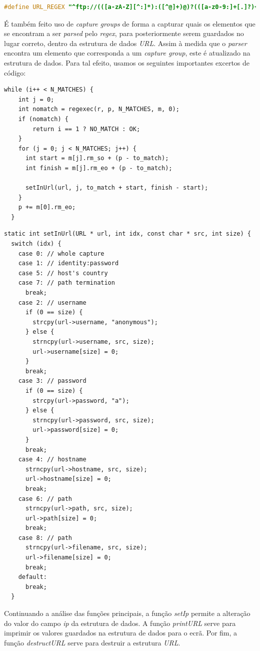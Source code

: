 \documentclass[a4paper, 11pt]{article}
\begin{document}
\begin{lstlisting}[language=C]
#define URL_REGEX "^ftp://(([a-zA-Z][^:]*):([^@]+)@)?(([a-z0-9:]+[.]?)+)/(([^/]+[/])*)([^/]+)$"
\end{lstlisting}

É também feito uso de \textit{capture groups} de forma a capturar quais os elementos que se encontram a ser \textit{parsed} pelo \textit{regex}, para posteriormente serem guardados no lugar correto, dentro da estrutura de dados \textit{URL}. Assim à medida que o \textit{parser} encontra um elemento que corresponda a um \textit{capture group}, este é atualizado na estrutura de dados. Para tal efeito, usamos os seguintes importantes excertos de código: 

\begin{lstlisting}[frame=tlrb]
while (i++ < N_MATCHES) {
    int j = 0;
    int nomatch = regexec(r, p, N_MATCHES, m, 0);
    if (nomatch) {
        return i == 1 ? NO_MATCH : OK;
    }
    for (j = 0; j < N_MATCHES; j++) {
      int start = m[j].rm_so + (p - to_match);
      int finish = m[j].rm_eo + (p - to_match);

      setInUrl(url, j, to_match + start, finish - start);
    }
    p += m[0].rm_eo;
  }
\end{lstlisting}
\begin{lstlisting}[frame=tlrb]
static int setInUrl(URL * url, int idx, const char * src, int size) {
  switch (idx) {
    case 0: // whole capture
    case 1: // identity:password
    case 5: // host's country
    case 7: // path termination
      break;
    case 2: // username
      if (0 == size) {
        strcpy(url->username, "anonymous");
      } else {
        strncpy(url->username, src, size);
        url->username[size] = 0;
      }
      break;
    case 3: // password
      if (0 == size) {
        strcpy(url->password, "a");
      } else {
        strncpy(url->password, src, size);
        url->password[size] = 0;
      }
      break;
    case 4: // hostname
      strncpy(url->hostname, src, size);
      url->hostname[size] = 0;
      break;
    case 6: // path
      strncpy(url->path, src, size);
      url->path[size] = 0;
      break;
    case 8: // path
      strncpy(url->filename, src, size);
      url->filename[size] = 0;
      break;
    default:
      break;
  }
\end{lstlisting}

Continuando a análise das funções principais, a função \textit{setIp} permite a alteração do valor do campo \textit{ip} da estrutura de dados.
A função \textit{printURL} serve para imprimir os valores guardados na estrutura de dados para o ecrã.
Por fim, a função \textit{destructURL} serve para destruir a estrutura \textit{URL}.\\
\end{document}
